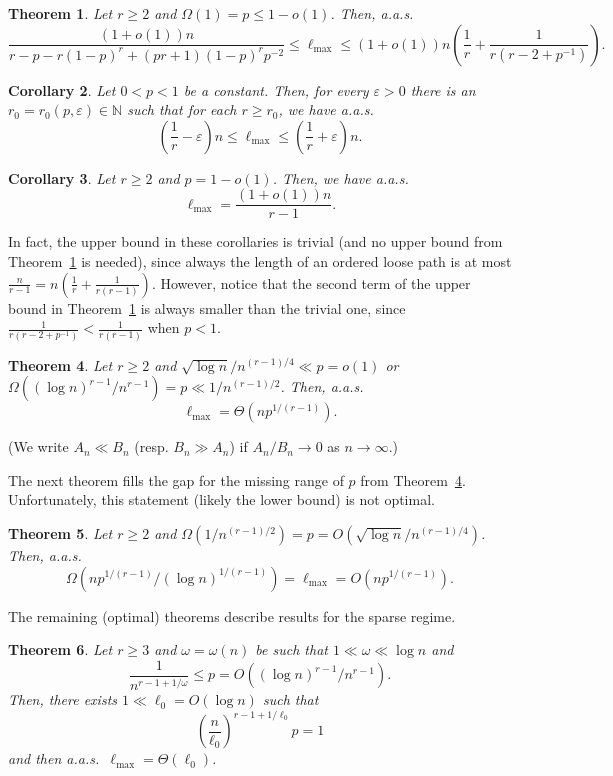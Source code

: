\documentclass[12pt,reqno]{amsart}
\newtheorem{theorem}{Theorem}[section]
\newtheorem{corollary}[theorem]{Corollary}
\theoremstyle{remark}
\def\e{\varepsilon} \def\f{\phi} \def\F{{\Phi}} \def\vp{\varphi} \def\g{\gamma}
\begin{document}
\begin{theorem}\label{thm:main1}
Let $r\ge 2$ and $\Omega(1)=p\le 1-o(1)$. Then, a.a.s.
\[
\frac{(1+o(1))n}{r -p - r(1-p)^r+ (pr+1)(1-p)^rp^{-2}} \le \ell_{\max} \le (1+o(1))n\left(\frac{1}{r} + \frac{1}{r(r-2+p^{-1})} \right).
\]
\end{theorem}


\begin{corollary}\label{cor:main1}
Let $0<p<1$ be a constant. Then, for every $\e>0$ there is an $r_0=r_0(p,\e)\in \mathbb{N}$ such that for each $r\ge r_0$, we have a.a.s.\
\[
\left(\frac{1}{r}-\e\right)n\le \ell_{\max} \le \left(\frac{1}{r}+\e\right)n.
\]
\end{corollary}

\begin{corollary}\label{cor:main2}
Let $r\ge 2$ and $p=1-o(1)$. Then, we have a.a.s.\
\[
\ell_{\max} = \frac{(1+o(1))n}{r-1}.
\]
\end{corollary}


In fact, the upper bound in these corollaries is trivial (and no upper bound from Theorem~\ref{thm:main1} is needed), since always the length of an ordered loose path is at most $\frac{n}{r-1} = n\left(\frac{1}{r} + \frac{1}{r(r-1)} \right)$. However, notice that the second term of the upper bound in Theorem~\ref{thm:main1} is always smaller than the trivial one, since $\frac{1}{r(r-2+p^{-1})} < \frac{1}{r(r-1)}$ when $p<1$.

\begin{theorem}\label{thm:main2}
Let $r\ge 2$ and $\sqrt{\log n}/n^{(r-1)/4}\ll p = o(1)$ or $\Omega((\log n)^{r-1}/n^{r-1})  = p \ll 1/n^{(r-1)/2}$. Then, a.a.s.\
\[
\ell_{\max} = \Theta(np^{1/(r-1)}).
\]
\end{theorem}
(We write $A_n\ll B_n$ (resp. $B_n\gg A_n$) if $A_n/B_n\to 0$ as $n\to\infty$.)

The next theorem fills the gap for the missing range of $p$ from Theorem~\ref{thm:main2}. Unfortunately, this statement (likely the lower bound) is not optimal.
\begin{theorem}\label{thm:main3}
Let $r\ge 2$ and $\Omega(1/n^{(r-1)/2}) = p = O(\sqrt{\log n}/n^{(r-1)/4})$. Then, a.a.s.\
\[
\Omega(np^{1/(r-1)}/(\log n)^{1/(r-1)}) =  \ell_{\max} = O(np^{1/(r-1)}).
\]
\end{theorem}

The remaining (optimal) theorems describe results for the sparse regime.
\begin{theorem}\label{thm:main4}
Let $r\ge 3$ and $\omega=\omega(n)$ be such that $1\ll \omega \ll \log n$ and 
\[
\frac{1}{n^{r-1+1/\omega}} \le p = O((\log n)^{r-1}/n^{r-1}).
\]
Then, there exists $1\ll \ell_0 = O(\log n)$ such that 
\[
\left(\frac{n}{\ell_0}\right)^{r-1+1/\ell_0} p =1
\] 
and then a.a.s.\ $\ell_{\max}=\Theta(\ell_0)$.
\end{theorem}
\end{document}
